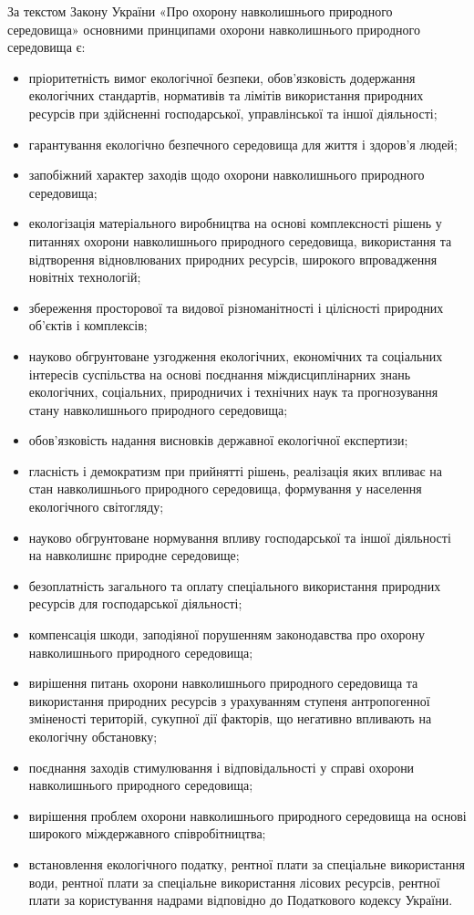 \documentclass[a4paper,oneside,DIV=10,12pt]{scrreprt}
\begin{document}
			За текстом Закону України «Про охорону навколишнього природного середовища» основними принципами охорони навколишнього природного середовища є:
			\begin{itemize}
				\item пріоритетність вимог екологічної безпеки, обов'язковість додержання екологічних стандартів, нормативів та лімітів використання природних ресурсів при здійсненні господарської, управлінської та іншої діяльності;
				\item гарантування екологічно безпечного середовища для життя і здоров'я людей;
				\item запобіжний характер заходів щодо охорони навколишнього природного середовища;
				\item екологізація матеріального виробництва на основі комплексності рішень у питаннях охорони навколишнього природного середовища, використання та відтворення відновлюваних природних ресурсів, широкого впровадження новітніх технологій;
				\item збереження просторової та видової різноманітності і цілісності природних об'єктів і комплексів;
				\item науково обгрунтоване узгодження екологічних, економічних та соціальних інтересів суспільства на основі поєднання міждисциплінарних знань екологічних, соціальних, природничих і технічних наук та прогнозування стану навколишнього природного середовища;
				\item обов’язковість надання висновків державної екологічної експертизи;
				\item гласність і демократизм при прийнятті рішень, реалізація яких впливає на стан навколишнього природного середовища, формування у населення екологічного світогляду;
				\item науково обгрунтоване нормування впливу господарської та іншої діяльності на навколишнє природне середовище;
				\item безоплатність загального та оплату спеціального використання природних ресурсів для господарської діяльності;
				\item компенсація шкоди, заподіяної порушенням законодавства про охорону навколишнього природного середовища;
				\item вирішення питань охорони навколишнього природного середовища та використання природних ресурсів з урахуванням ступеня антропогенної зміненості територій, сукупної дії факторів, що негативно впливають на екологічну обстановку;
				\item поєднання заходів стимулювання і відповідальності у справі охорони навколишнього природного середовища;
				\item вирішення проблем охорони навколишнього природного середовища на основі широкого міждержавного співробітництва;
				\item встановлення екологічного податку, рентної плати за спеціальне використання води, рентної плати за спеціальне використання лісових ресурсів, рентної плати за користування надрами відповідно до Податкового кодексу України.
			\end{itemize}
		
\end{document}
